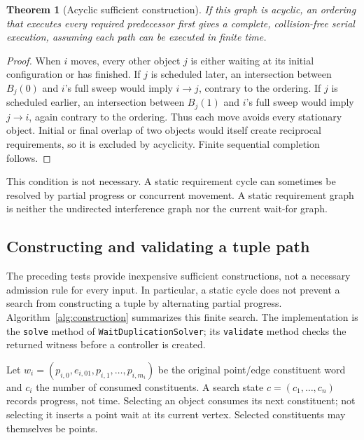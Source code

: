 \documentclass[11pt,a4paper]{article}
\newtheorem{theorem}{Theorem}
\theoremstyle{remark}
\begin{document}
\begin{theorem}[Acyclic sufficient construction]
\label{thm:dag}
If this graph is acyclic, an ordering that executes every required predecessor
first gives a complete, collision-free serial execution, assuming each path
can be executed in finite time.
\end{theorem}
\begin{proof}
When $i$ moves, every other object $j$ is either waiting at its initial
configuration or has finished. If $j$ is scheduled later, an intersection
between $B_j(0)$ and $i$'s full sweep would imply $i\to j$, contrary to the
ordering. If $j$ is scheduled earlier, an intersection between $B_j(1)$ and
$i$'s full sweep would imply $j\to i$, again contrary to the ordering.
Thus each move avoids every stationary object. Initial or final overlap of
two objects would itself create reciprocal requirements, so it is excluded
by acyclicity. Finite sequential completion follows.
\end{proof}

This condition is not necessary. A static requirement cycle can sometimes
be resolved by partial progress or concurrent movement. A static requirement
graph is neither the undirected interference graph nor the current wait-for graph.


\subsection{Constructing and validating a tuple path}
The preceding tests provide inexpensive sufficient constructions, not a
necessary admission rule for every input. In particular, a static cycle
does not prevent a search from constructing a tuple by alternating partial
progress. Algorithm~\ref{alg:construction} summarizes this finite search.
The implementation is the \texttt{solve} method of
\texttt{WaitDuplicationSolver}; its \texttt{validate} method checks the
returned witness before a controller is created.

Let $w_i=(p_{i,0},e_{i,01},p_{i,1},\ldots,p_{i,m_i})$ be the original
point/edge constituent word and $c_i$ the number of consumed constituents.
A search state $c=(c_1,\ldots,c_n)$ records progress, not time. Selecting an
object consumes its next constituent; not selecting it inserts a point wait
at its current vertex. Selected constituents may themselves be points.
\end{document}
